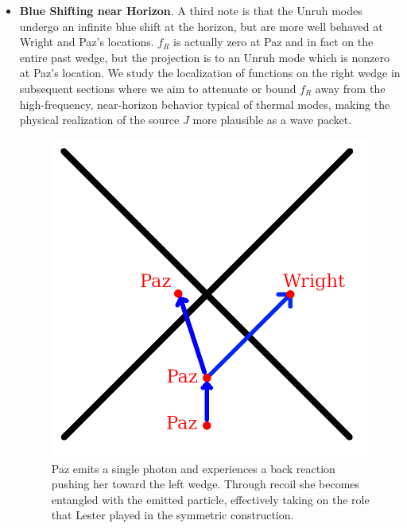 \documentclass[12pt,a4paper]{article}
\begin{document}
{\begin{itemize}
\item {\bf Blue Shifting near Horizon}. A third note is that the Unruh modes undergo an infinite blue shift at the horizon, but are more well behaved at Wright and Paz's locations. $f_R$ is actually zero at Paz and in fact on the entire past wedge, but the projection is to an Unruh mode which is nonzero at Paz's location. We study the localization of functions on the right wedge in subsequent sections where we aim to attenuate or bound $f_R$ away from the high-frequency, near-horizon behavior typical of thermal modes, making the physical realization of the source $J$ more plausible as a wave packet.

\begin{figure}[h]
\centering
\includegraphics[scale=0.75]{back_reaction.png}
\captionsetup{width=0.7\textwidth}
\caption{Paz emits a single photon and experiences a back reaction pushing her toward the left wedge. Through recoil she becomes entangled with the emitted particle, effectively taking on the role that Lester played in the symmetric construction.}
\label{back_react}
\end{figure}


\end{itemize}}
\end{document}
